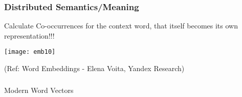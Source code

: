 \begin{frame}[fragile]\frametitle{Distributed Semantics/Meaning}
Calculate Co-occurrences for the context word, that itself becomes its own representation!!!

\begin{center}
\texttt{[image: emb10]}
\end{center}

{\tiny (Ref: Word Embeddings - Elena Voita, Yandex Research)}
\end{frame}









\begin{frame}[fragile]\frametitle{}

\begin{center}
{\Large Modern Word Vectors}
\end{center}
\end{frame}




